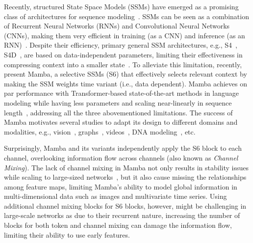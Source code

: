 \documentclass{article}
\begin{document}
Recently, structured State Space Models (SSMs) have emerged as a promising class of architectures for sequence modeling~\citep{gu2022efficiently, fu2023h3, smith2023convolutional}. SSMs can be seen as a combination of Recurrent Neural Networks (RNNs) and Convolutional Neural Networks (CNNs), making them very efficient  in training (as a CNN) and inference (as an RNN)~\citep{gu2020hippo}. Despite their efficiency, primary general SSM architectures, e.g., S4~\citep{gu2022efficiently}, S4D~\citep{gu2022S4D}, are based on data-independent parameters, limiting their effectiveness in compressing context into a smaller state~\citep{gu2023mamba}. To alleviate this limitation, recently, \citet{gu2023mamba} present Mamba, a selective SSMs (S6) that effectively selects relevant context by making the SSM weights time variant (i.e., data dependent). Mamba achieves on par performance with Transformer-based state-of-the-art methods in language modeling while having less parameters and scaling near-linearly in sequence length~\citep{gu2023mamba}, addressing all the three abovementioned limitations. The success of Mamba motivates several studies to adapt its design to different domains and modalities, e.g., vision~\citep{zhu2024ViM, liu2024vmamba}, graphs~\citep{behrouz2024graph}, videos~\citep{li2024mamband}, DNA modeling~\citep{schiff2024caduceus}, etc.   


Surprisingly, Mamba and its variants independently apply the S6 block to each channel, overlooking information flow across channels (also known as \emph{Channel Mixing}). The lack of channel mixing in Mamba not only results in stability issues while scaling to large-sized networks~\citep{patro2024simba}, but it also cause missing the relationships among feature maps, limiting Mamba's ability to model global information in multi-dimensional data such as images and multivariate time series. Using additional channel mixing blocks for S6 blocks, however, might be challenging in large-scale networks as due to their recurrent nature, increasing the number of blocks for both token and channel mixing can damage the information flow, limiting their ability to use early features. 
\end{document}
